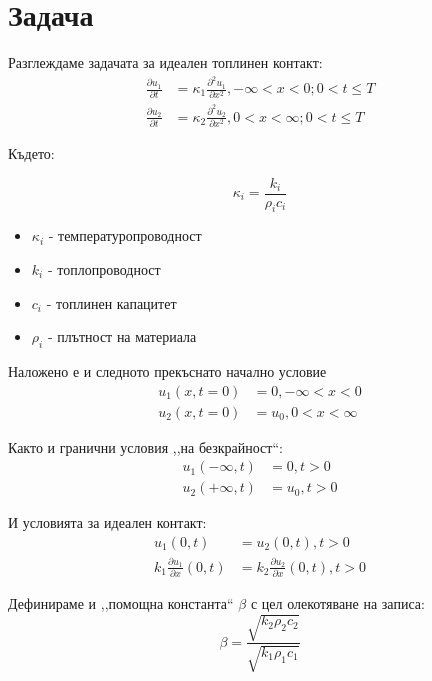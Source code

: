 \setcounter{page}{2}

\section{Задача}

Разглеждаме задачата за идеален топлинен контакт:
\begin{align}
    \frac{\partial u_1}{\partial t} &= \kappa_{1}  \frac{\partial ^ 2 u_1}{\partial x ^ 2}, - \infty < x < 0; 0 < t \leq T \\ 
    \frac{\partial u_2}{\partial t} &= \kappa_{2}  \frac{\partial ^ 2 u_2}{\partial x ^ 2}, 0 < x < \infty; 0 < t \leq T
\end{align}

Където:

\begin{equation}
    \kappa_{i} = \frac{k_{i}}{\rho_{i} c_{i}}
\end{equation}

\begin{itemize}
    \item $\kappa_{i}$ - температуропроводност
    \item $k_{i}$ - топлопроводност
    \item $c_{i}$ - топлинен капацитет
    \item $\rho_{i}$  - плътност на материала
\end{itemize}

Наложено е и следното прекъснато начално условие
\begin{align}
    u_{1}(x, t = 0) &= 0, -\infty < x < 0 \\
    u_{2}(x, t = 0) &= u_0, 0 < x < \infty
\end{align}

Както и гранични условия ,,на безкрайност``:
\begin{align}
    u_{1}(-\infty, t) &= 0, t > 0 \\
    u_{2}(+\infty, t) &= u_0, t > 0 
\end{align}
 
И условията за идеален контакт:
\begin{align}
    u_{1}(0, t) &= u_2(0, t),  t > 0 \\
    k_{1}\frac{\partial u_1}{\partial x} (0, t) &= k_{2}\frac{\partial u_2}{\partial x} (0, t), t > 0
\end{align}

Дефинираме и ,,помощна константа`` $\beta$ с цел олекотяване на записа:
\begin{equation*}
    \beta = \frac{\sqrt{k_2 \rho_2 c_2}}{\sqrt{k_1 \rho_1 c_1}}
\end{equation*}

